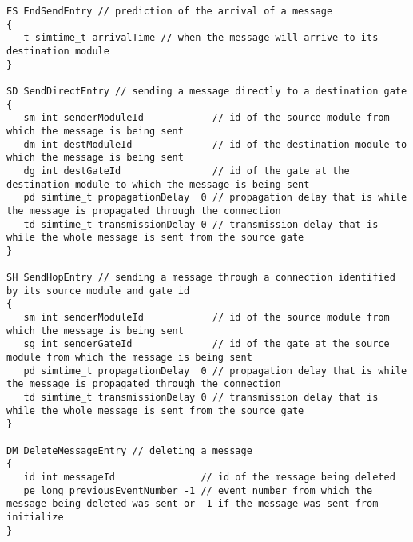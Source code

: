 \begin{verbatim}
ES EndSendEntry // prediction of the arrival of a message
{
   t simtime_t arrivalTime // when the message will arrive to its destination module
}

SD SendDirectEntry // sending a message directly to a destination gate
{
   sm int senderModuleId            // id of the source module from which the message is being sent
   dm int destModuleId              // id of the destination module to which the message is being sent
   dg int destGateId                // id of the gate at the destination module to which the message is being sent
   pd simtime_t propagationDelay  0 // propagation delay that is while the message is propagated through the connection
   td simtime_t transmissionDelay 0 // transmission delay that is while the whole message is sent from the source gate
}

SH SendHopEntry // sending a message through a connection identified by its source module and gate id
{
   sm int senderModuleId            // id of the source module from which the message is being sent
   sg int senderGateId              // id of the gate at the source module from which the message is being sent
   pd simtime_t propagationDelay  0 // propagation delay that is while the message is propagated through the connection
   td simtime_t transmissionDelay 0 // transmission delay that is while the whole message is sent from the source gate
}

DM DeleteMessageEntry // deleting a message
{
   id int messageId               // id of the message being deleted
   pe long previousEventNumber -1 // event number from which the message being deleted was sent or -1 if the message was sent from initialize
}
\end{verbatim}


